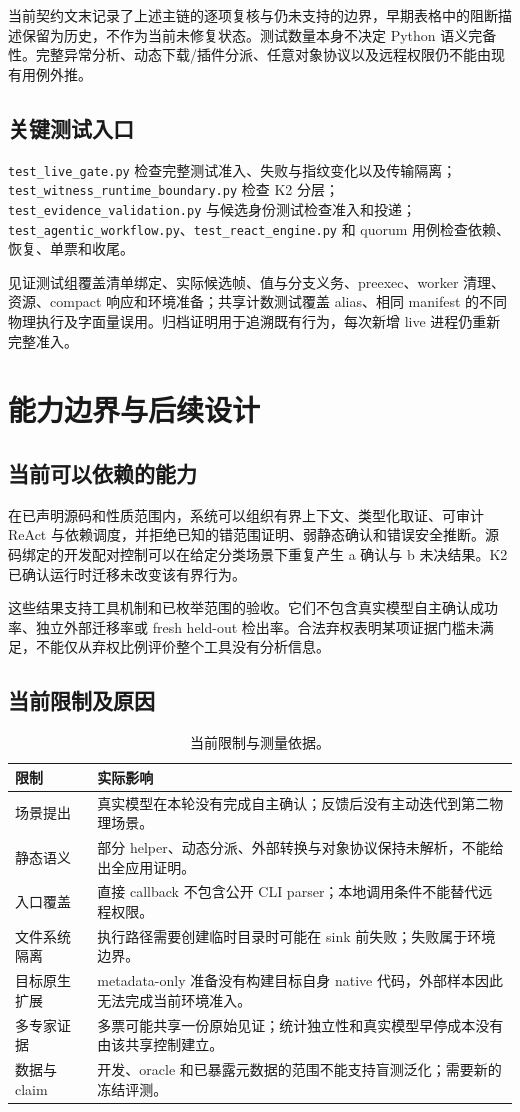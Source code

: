 \documentclass[UTF8,a4paper,zihao=-4,fontset=none]{ctexart}
\newcommand{\code}[1]{{\small\nolinkurl{#1}}}
\begin{document}
当前契约文末记录了上述主链的逐项复核与仍未支持的边界，早期表格中的阻断描述保留为历史，不作为当前未修复状态。测试数量本身不决定 Python 语义完备性。完整异常分析、动态下载/插件分派、任意对象协议以及远程权限仍不能由现有用例外推。

\subsection{关键测试入口}
\code{test_live_gate.py} 检查完整测试准入、失败与指纹变化以及传输隔离；\code{test_witness_runtime_boundary.py} 检查 K2 分层；\code{test_evidence_validation.py} 与候选身份测试检查准入和投递；\code{test_agentic_workflow.py}、\code{test_react_engine.py} 和 quorum 用例检查依赖、恢复、单票和收尾。

见证测试组覆盖清单绑定、实际候选帧、值与分支义务、preexec、worker 清理、资源、compact 响应和环境准备；共享计数测试覆盖 alias、相同 manifest 的不同物理执行及字面量误用。归档证明用于追溯既有行为，每次新增 live 进程仍重新完整准入。

\section{能力边界与后续设计}
\subsection{当前可以依赖的能力}
在已声明源码和性质范围内，系统可以组织有界上下文、类型化取证、可审计 ReAct 与依赖调度，并拒绝已知的错范围证明、弱静态确认和错误安全推断。源码绑定的开发配对控制可以在给定分类场景下重复产生 a 确认与 b 未决结果。K2 已确认运行时迁移未改变该有界行为。

这些结果支持工具机制和已枚举范围的验收。它们不包含真实模型自主确认成功率、独立外部迁移率或 fresh held-out 检出率。合法弃权表明某项证据门槛未满足，不能仅从弃权比例评价整个工具没有分析信息。

\subsection{当前限制及原因}
\begin{longtable}{L{34mm}L{115mm}}
\caption{当前限制与测量依据。}\\
\toprule 限制 & 实际影响\\\midrule\endfirsthead
场景提出 & 真实模型在本轮没有完成自主确认；反馈后没有主动迭代到第二物理场景。\\
静态语义 & 部分 helper、动态分派、外部转换与对象协议保持未解析，不能给出全应用证明。\\
入口覆盖 & 直接 callback 不包含公开 CLI parser；本地调用条件不能替代远程权限。\\
文件系统隔离 & 执行路径需要创建临时目录时可能在 sink 前失败；失败属于环境边界。\\
目标原生扩展 & metadata-only 准备没有构建目标自身 native 代码，外部样本因此无法完成当前环境准入。\\
多专家证据 & 多票可能共享一份原始见证；统计独立性和真实模型早停成本没有由该共享控制建立。\\
数据与 claim & 开发、oracle 和已暴露元数据的范围不能支持盲测泛化；需要新的冻结评测。\\
\bottomrule
\end{longtable}
\end{document}
